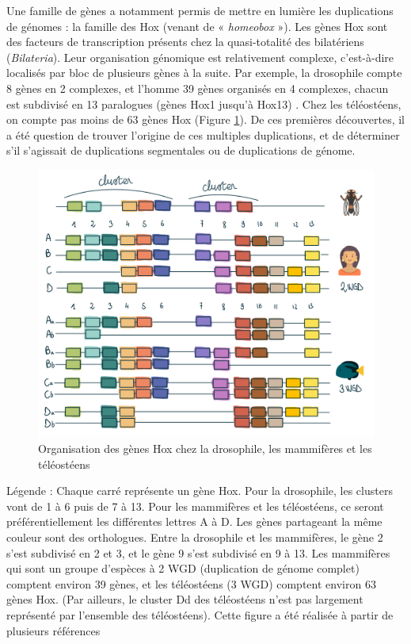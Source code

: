 \par Une famille de gènes a notamment permis de mettre en lumière les duplications de génomes : la famille des Hox (venant de « \textit{homeobox} »). Les gènes Hox sont des facteurs de transcription présents chez la quasi-totalité des bilatériens (\textit{Bilateria}). Leur organisation génomique est relativement complexe, c’est-à-dire localisés par bloc de plusieurs gènes à la suite. Par exemple, la drosophile compte 8 gènes en 2 complexes, et l’homme 39 gènes organisés en 4 complexes, chacun est subdivisé en 13 paralogues (gènes Hox1 jusqu’à Hox13) \parencite{hoegg_hox_2005, meyer_vertebrate_1999, rux_hox_2017}. Chez les téléostéens, on compte pas moins de 63 gènes Hox \parencite{meyer_vertebrate_1999, stellwag_hox_1999} (Figure \ref{fig:3_hox}). De ces premières découvertes, il a été question de trouver l’origine de ces multiples duplications, et de déterminer s’il s’agissait de duplications segmentales ou de duplications de génome. 

\begin{figure}[H]
    \centering
    \includegraphics[width=1\textwidth]{figures/corps/figure3.png}
    \caption{Organisation des gènes Hox chez la drosophile, les mammifères et les téléostéens}
    \label{fig:3_hox}
\end{figure}
Légende : Chaque carré représente un gène Hox. Pour la drosophile, les clusters vont de 1 à 6 puis de 7 à 13. Pour les mammifères et les téléostéens, ce seront préférentiellement les différentes lettres A à D. Les gènes partageant la même couleur sont des orthologues. 
Entre la drosophile et les mammifères, le gène 2 s’est subdivisé en 2 et 3, et le gène 9 s’est subdivisé en 9 à 13. Les mammifères qui sont un groupe d’espèces à 2 WGD (duplication de génome complet) comptent environ 39 gènes, et les téléostéens (3 WGD) comptent environ 63 gènes Hox. (Par ailleurs, le cluster Dd des téléostéens n’est pas largement représenté par l’ensemble des téléostéens). Cette figure a été réalisée à partir de plusieurs références \cite{amores_zebrafish_1998, guo_hox_2010, lappin_hox_2006, rux_hox_2017} \newpage

